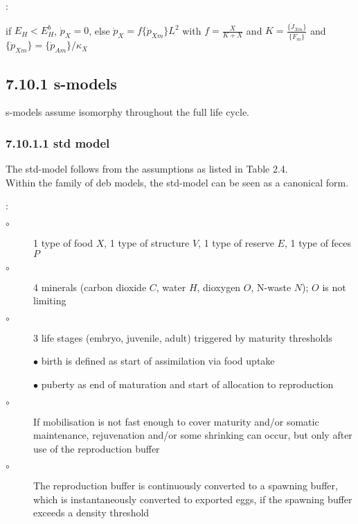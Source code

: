 \vspace{5mm}: {\small
\begin{description}
  \item if $E_H < E_H^b$, $\dot{p}_X = 0$,  else $\dot{p}_X = f \{\dot{p}_{Xm}\} L^2$ with 
	   $f = \frac{X} {K + X}$ and $K = \frac{\{\dot{J}_{Xm}\}} {\{\dot{F}_m\}}$ and
		 $\{\dot{p}_{Xm}\} = \{\dot{p}_{Am}\}/ \kappa_X$
\end{description}}

\subsection*{7.10.1 s-models}
{}
\label{sec_c:s-models}

s-models assume isomorphy throughout the full life cycle.

\subsubsection*{7.10.1.1 std model}
{}
\label{sec_c:std}

The std-model follows from the assumptions as listed in Table 2.4.\\
Within the family of {\sc deb} models, the std-model can be seen as a canonical form.

\vspace{5mm}: {\small
\begin{description}
  \item[$\circ$] 1 type of food $X$, 1 type of structure $V$, 1 type of reserve $E$, 1 type of feces $P$ 
	
	\item[$\circ$] 4 minerals (carbon dioxide $C$, water $H$, dioxygen $O$, N-waste $N$); $O$ is not limiting 
	
  \item[$\circ$] 3 life stages (embryo, juvenile, adult) triggered by maturity thresholds
	
	  \subitem $\bullet$ birth is defined as start of assimilation via food uptake 
		
		\subitem $\bullet$ puberty as end of maturation and start of allocation to reproduction
		
	\item[$\circ$] If mobilisation is not fast enough to cover maturity and/or somatic maintenance,
	  rejuvenation and/or some shrinking can occur, but only after use of the reproduction buffer
		
	\item[$\circ$] The reproduction buffer is continuously converted to a spawning buffer, which is instantaneously converted to exported eggs,
	  if the spawning buffer exceeds a density threshold
\end{description}}

